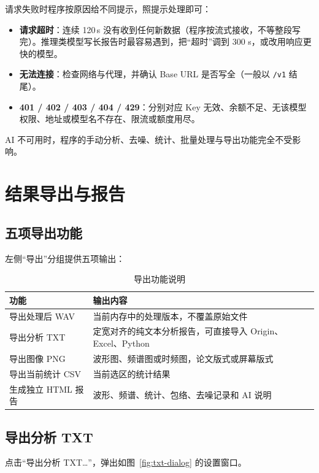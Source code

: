 \documentclass[UTF8,a4paper,12pt,scheme=chinese]{ctexart}
\begin{document}
请求失败时程序按原因给不同提示，照提示处理即可：

\begin{itemize}
  \item \textbf{请求超时}：连续 120\,s 没有收到任何新数据（程序按流式接收，不等整段写完）。推理类模型写长报告时最容易遇到，把“超时”调到 300 s，或改用响应更快的模型。
  \item \textbf{无法连接}：检查网络与代理，并确认 Base URL 是否写全（一般以 \texttt{/v1} 结尾）。
  \item \textbf{401 / 402 / 403 / 404 / 429}：分别对应 Key 无效、余额不足、无该模型权限、地址或模型名不存在、限流或额度用尽。
\end{itemize}

AI 不可用时，程序的手动分析、去噪、统计、批量处理与导出功能完全不受影响。

\section{结果导出与报告}

\subsection{五项导出功能}

左侧“导出”分组提供五项输出：

\begin{table}[htbp]
\centering
\caption{导出功能说明}
\begin{tabular}{@{}l p{8.4cm}@{}}
\toprule
功能 & 输出内容 \\
\midrule
导出处理后 WAV & 当前内存中的处理版本，不覆盖原始文件 \\
导出分析 TXT & 定宽对齐的纯文本分析报告，可直接导入 Origin、Excel、Python \\
导出图像 PNG & 波形图、频谱图或时频图，论文版式或屏幕版式 \\
导出当前统计 CSV & 当前选区的统计结果 \\
生成独立 HTML 报告 & 波形、频谱、统计、包络、去噪记录和 AI 说明 \\
\bottomrule
\end{tabular}
\end{table}

\subsection{导出分析 TXT}

点击“导出分析 TXT…”，弹出如图~\ref{fig:txt-dialog} 的设置窗口。
\end{document}
